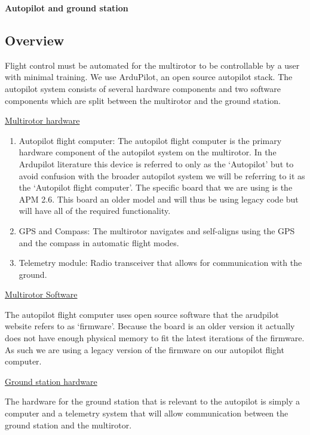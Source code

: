 \textbf{Autopilot and ground station}

\subsection{Overview}

Flight control must be automated for the multirotor to be controllable by a user with minimal training. We use ArduPilot, an open source autopilot stack. The autopilot system consists of several hardware components and two software components which are split between the multirotor and the ground station.

\underline{Multirotor hardware}\

\begin{enumerate}

    \item Autopilot flight computer: The autopilot flight computer is the primary hardware component of the autopilot system on the multirotor. In the Ardupilot literature this device is referred to only as the ‘Autopilot’ but to avoid confusion with the broader autopilot system we will be referring to it as the ‘Autopilot flight computer’. The specific board that we are using is the APM 2.6. This board an older model and will thus be using legacy code but will have all of the required functionality.
  
  \item GPS and Compass: The multirotor navigates and self-aligns using the GPS and the compass in automatic flight modes.
 
 \item Telemetry module: Radio transceiver that allows for communication with the ground.
 
\end{enumerate}

\underline{Multirotor Software}

The autopilot flight computer uses open source software that the arudpilot website refers to as ‘firmware’. Because the board is an older version it actually does not have enough physical memory to fit the latest iterations of the firmware. As such we are using a legacy version of the firmware on our autopilot flight computer.

\underline{Ground station hardware}

The hardware for the ground station that is relevant to the autopilot is simply a computer and a telemetry system that will allow communication between the ground station and the multirotor.

